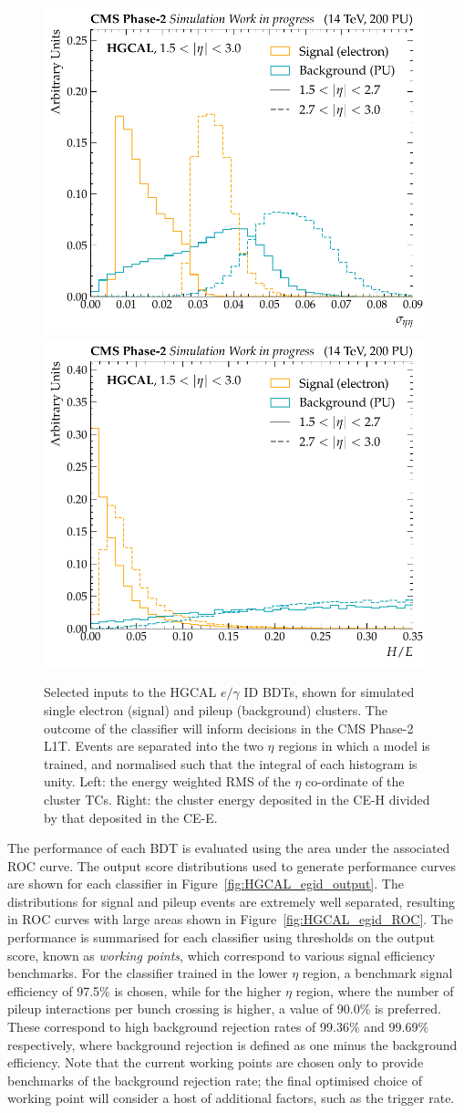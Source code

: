 \begin{figure}[htbp!]
\centering
\includegraphics[width=0.49\linewidth]{Figures/Detector/HGCAL/InputsOutputs/sig_vs_bkg_cl3d_seetot_both_eta.pdf}\hfill%
\includegraphics[width=0.49\linewidth]{Figures/Detector/HGCAL/InputsOutputs/sig_vs_bkg_cl3d_hoe_both_eta.pdf}
\caption[Selected inputs to the HGCAL L1T $e/\gamma$ identification BDTs.]{Selected inputs to the HGCAL $e/\gamma$ ID BDTs, shown for simulated single electron (signal) and pileup (background) clusters. The outcome of the classifier will inform decisions in the CMS Phase-2 L1T. Events are separated into the two $\eta$ regions in which a model is trained, and normalised such that the integral of each histogram is unity.  Left: the energy weighted RMS of the $\eta$ co-ordinate of the cluster TCs. Right: the cluster energy deposited in the CE-H divided by that deposited in the CE-E.}
\label{fig:HGCAL_egid_inputs}
\end{figure}

The performance of each BDT is evaluated using the area under the associated ROC curve. The output score distributions used to generate performance curves are shown for each classifier in Figure~\ref{fig:HGCAL_egid_output}. The distributions for signal and pileup events are extremely well separated, resulting in ROC curves with large areas shown in Figure~\ref{fig:HGCAL_egid_ROC}. The performance is summarised for each classifier using thresholds on the output score, known as \textit{working points}, which correspond to various signal efficiency benchmarks. For the classifier trained in the lower $\eta$ region, a benchmark signal efficiency of 97.5\% is chosen, while for the higher $\eta$ region, where the number of pileup interactions per bunch crossing is higher, a value of 90.0\% is preferred. These correspond to high background rejection rates of 99.36\% and 99.69\% respectively, where background rejection is defined as one minus the background efficiency. Note that the current working points are chosen only to provide benchmarks of the background rejection rate; the final optimised choice of working point will consider a host of additional factors, such as the trigger rate.

